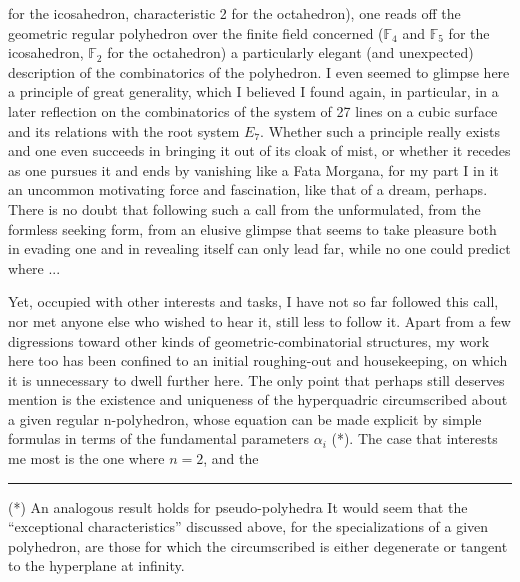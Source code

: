 
for the icosahedron, characteristic 2 for the octahedron), one reads
off the geometric regular polyhedron over the finite field concerned
($\mathbb{F}_4$ and $\mathbb{F}_5$ for the icosahedron, $\mathbb{F}_2$ for the octahedron) a particularly
elegant (and unexpected) description of the combinatorics
of the polyhedron. I even seemed to glimpse here a principle
of great generality, which I believed I found again, in particular, in
a later reflection on the combinatorics of the system of 27
lines on a cubic surface and its relations with the root
system $E_7$. Whether such a principle really exists and one
even succeeds in bringing it out of its cloak of mist, or whether it
recedes as one pursues it and ends by
vanishing like a Fata Morgana,
for my part I 
in it an uncommon motivating force and fascination,
like that of a dream, perhaps. There is no doubt that following such a call from the
unformulated, from the formless seeking form, from an elusive
glimpse that seems to take pleasure both in evading one and in
revealing itself can only lead far, while no one could
predict where ...

Yet, occupied with other interests and tasks, I have
not so far followed this call, nor met anyone else
who wished to hear it, still less to follow it. Apart from
a few digressions toward other kinds of geometric-combinatorial
structures, my work here too has been confined to an initial
roughing-out and housekeeping, on which it is unnecessary
to dwell further here. The only point that perhaps still deserves
mention is the existence and uniqueness of the hyperquadric circumscribed
about a given regular n-polyhedron, whose equation can be made
explicit by simple formulas in terms of the fundamental parameters
$\alpha_i$ (*). The case that interests me most is the one where $n = 2$, and the

\rule{5cm}{0.4pt}

(*) An analogous result holds for pseudo-polyhedra It would seem
that the ``exceptional characteristics'' discussed above,
for the specializations of a given polyhedron, are those for
which the circumscribed  is either degenerate or
tangent to the hyperplane at infinity.


